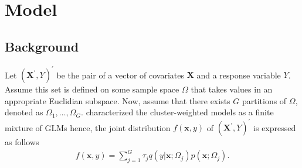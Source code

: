 \documentclass[11pt,letterpaper]{article}
\numberwithin{equation}{section}
\numberwithin{equation}{section}
\numberwithin{equation}{section}
\begin{document}
\section{Model}

\subsection{Background}

Let $(\bm{X^{'}}, Y)^{'}$  be the pair of a vector of covariates  $\bm{X}$ and a response variable $Y$. Assume this set is defined on some sample space $\Omega$ that takes values in an appropriate Euclidian subspace. Now, assume that there exists $G$ partitions of $\Omega$, denoted as $\Omega_1, \ldots, \Omega_G$.  \cite{Gershenfeld:1997} characterized the cluster-weighted models as a finite mixture of GLMs hence, the joint distribution $f(\bm x, y)$ of $(\bm{X^{'}}, Y )^{'}$  is expressed as follows
 \begin{align}
 f(\bm x, y)= \sum_{j=1}^{G} \tau_j q(y|\bm{x};\Omega_j)p(\bm{x};\Omega_j).
\label{eq1}
\end{align}
\end{document}

